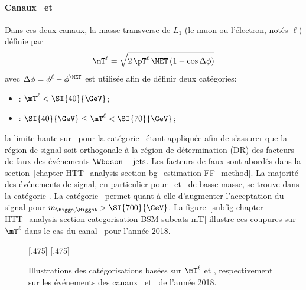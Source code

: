 \paragraph{Canaux \mu\tauh\ et \ele\tauh}
Dans ces deux canaux, la masse transverse de $L_1$ (le muon ou l'électron, notés $\ell$) définie par
\begin{equation}
\mT^{\ell} = \sqrt{2 \, \pT^{\ell} \, \MET \, (1-\cos\Delta\phi)} \label{eq-mT_def-ell}
\end{equation}
avec $\Delta\phi = \phi^{\ell} - \phi^{\MET}$
est utilisée afin de définir deux catégories:
\begin{itemize}
\item \CATtightmt: $\mT^{\ell} < \SI{40}{\GeV}$;
\item \CATloosemt: $\SI{40}{\GeV} \leq \mT^{\ell} < \SI{70}{\GeV}$;
\end{itemize}
la limite haute sur \mT\ pour la catégorie \CATloosemt\ étant appliquée afin de s'assurer que la région de signal soit orthogonale à la région de détermination (DR) des facteurs de faux des événements $\Wboson+\text{jets}$.
Les facteurs de faux sont abordés dans la section~\ref{chapter-HTT_analysis-section-bg_estimation-FF_method}.
La majorité des événements de signal, en particulier pour \Higgs\ et \HiggsA\ de basse masse, se trouve dans la catégorie \CATtightmt.
La catégorie \CATloosemt\ permet quant à elle d'augmenter l'acceptation du signal pour $m_{\Higgs,\HiggsA} > \SI{700}{\GeV}$.
La figure~\ref{subfig-chapter-HTT_analysis-section-categorisation-BSM-subcats-mT} illustre ces coupures sur $\mT^{\ell}$ dans le cas du canal \ele\tauh\ pour l'année 2018.
\begin{figure}[h]
\centering

[.475\textwidth]
{}
\hfill
{}[.475\textwidth]
{}

\caption[Illustrations des catégorisations basées sur $\mT^{\ell}$ et \Dzeta]{Illustrations des catégorisations basées sur $\mT^{\ell}$ et \Dzeta, respectivement sur les événements des canaux \ele\tauh\ et \ele\mu\ de l'année 2018.}
\label{fig-chapter-HTT_analysis-section-categorisation-BSM-subcats}
\end{figure}
